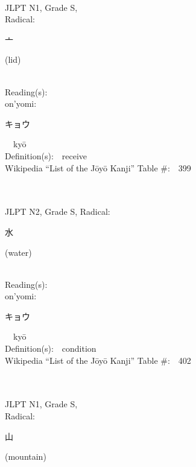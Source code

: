\begin{multicols}{2}
{\fontsize{34pt}{40pt}  }\ \ \\
{JLPT N1, Grade S, \\Radical:\ \ {\begin{CJK}{UTF8}{min} 亠 \end{CJK}} (lid) } \\
Reading(s):\ \ \\
{\hspace*{1em}}on'yomi:\ \ \\
{\hspace*{2em}}{\begin{CJK}{UTF8}{min} キョウ \end{CJK}}\ \ ky\=o\ \ \\
Definition(s):\ \ receive \\
Wikipedia ``List of the J\=oy\=o Kanji'' Table \#:\ \ 399 \\
\ \ \\
{\fontsize{34pt}{40pt}  }\ \ \\  %
{JLPT N2, Grade S, Radical:\ \ {\begin{CJK}{UTF8}{min} 水 \end{CJK}} (water) } \\
Reading(s):\ \ \\
{\hspace*{1em}}on'yomi:\ \ \\
{\hspace*{2em}}{\begin{CJK}{UTF8}{min} キョウ \end{CJK}}\ \ ky\=o\ \ \\
Definition(s):\ \ condition \\
Wikipedia ``List of the J\=oy\=o Kanji'' Table \#:\ \ 402 \\
\ \ \\
{\fontsize{34pt}{40pt}  }\ \ \\
{JLPT N1, Grade S, \\Radical:\ \ {\begin{CJK}{UTF8}{min} 山 \end{CJK}} (mountain) } \\

\end{multicols}
